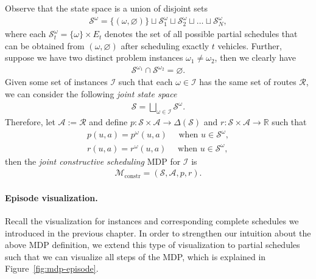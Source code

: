 \documentclass[a4paper]{report}
\theoremstyle{definition}
\theoremstyle{plain}
\begin{document}
Observe that the state space is a union of disjoint sets
\begin{align}
  \label{eq:8}
  \mathcal{S}^\omega = \{(\omega, \varnothing)\} \sqcup \mathcal{S}_1^\omega \sqcup \mathcal{S}_2^\omega \sqcup \dots \sqcup \mathcal{S}_N^\omega ,
\end{align}
where each $\mathcal{S}_t^\omega = \{\omega\} \times E_t$ denotes the set of all possible
partial schedules that can be obtained from $(\omega, \varnothing)$ after scheduling
exactly $t$ vehicles.
%
Further, suppose we have two distinct problem instances $\omega_1 \neq \omega_2$, then we
clearly have
\begin{align}
  \mathcal{S}^{\omega_1} \cap \mathcal{S}^{\omega_2} = \varnothing .
\end{align}
%
Given some set of instances $\mathcal{I}$ such that each $\omega \in \mathcal{I}$ has
the same set of routes $\mathcal{R}$, we can consider the following \emph{joint state space}
\begin{align}
  \mathcal{S} = \bigsqcup_{\omega \in \mathcal{I}} \mathcal{S}^\omega .
\end{align}
Therefore, let $\mathcal{A} := \mathcal{R}$ and define
$p : \mathcal{S} \times \mathcal{A} \rightarrow \Delta(\mathcal{S})$ and
$r : \mathcal{S} \times \mathcal{A} \rightarrow \mathbb{R}$ such that
\begin{align*}
  p(u, a) = p^\omega(u, a) \quad \text{ when } u \in \mathcal{S}^\omega , \\
  r(u, a) = r^\omega(u, a) \quad \text{ when } u \in \mathcal{S}^\omega ,
\end{align*}
%
then the \emph{joint constructive scheduling} MDP for $\mathcal{I}$ is
\begin{align}
  \tag{M}
  \mathcal{M}_\mathrm{constr} = (\mathcal{S}, \mathcal{A}, p, r) .
\end{align}


\paragraph{Episode visualization.}

Recall the visualization for instances and corresponding complete schedules we
introduced in the previous chapter. In order to strengthen our intuition about
the above MDP definition, we extend this type of visualization to partial
schedules such that we can visualize all steps of the MDP, which is explained in
Figure~\ref{fig:mdp-episode}.
\end{document}
